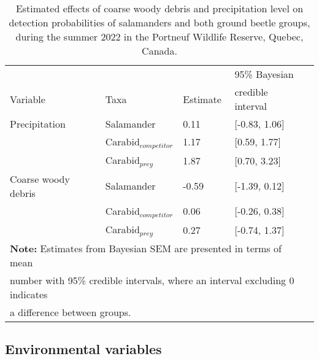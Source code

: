 \begin{table}[ht]
  \centering
  \caption[Estimated effects of coarse woody debris and precipitation level on detection probabilities of salamanders and both ground beetle groups.]
  {Estimated effects of coarse woody debris and precipitation level on detection probabilities of salamanders and both ground beetle groups, during the summer 2022 in the Portneuf Wildlife Reserve,  Quebec, Canada.}
  \label{tab:detection}
  \begin{tabular}{lllll} 
      \hline
      &&&95\% Bayesian \\
      Variable & Taxa & Estimate &  credible interval \\ [0.5ex] 
      \hline      
      Precipitation       & Salamander              & \hspace{1mm}0.11 & [-0.83, 1.06] \\ 
                          & Carabid$_{competitor}$  & \hspace{1mm}1.17 & [0.59, 1.77] \\ 
                          & Carabid$_{prey}$        & \hspace{1mm}1.87 & [0.70, 3.23] \\  
      \hline      
      Coarse woody debris & Salamander              & -0.59 & [-1.39, 0.12] \\ 
                          & Carabid$_{competitor}$  & \hspace{1mm}0.06 & [-0.26, 0.38] \\ 
                          & Carabid$_{prey}$        & \hspace{1mm}0.27 & [-0.74, 1.37] \\   

      \hline
      \multicolumn{4}{l}{\textbf{Note:} Estimates from Bayesian SEM are presented in terms of mean} \\
      \multicolumn{4}{l}{number with 95\% credible intervals, where an interval excluding 0 indicates} \\
      \multicolumn{4}{l}{a difference between groups.} \\
  \end{tabular}
\end{table}


\subsection*{Environmental variables}
\label{subsec:ResEnv}

